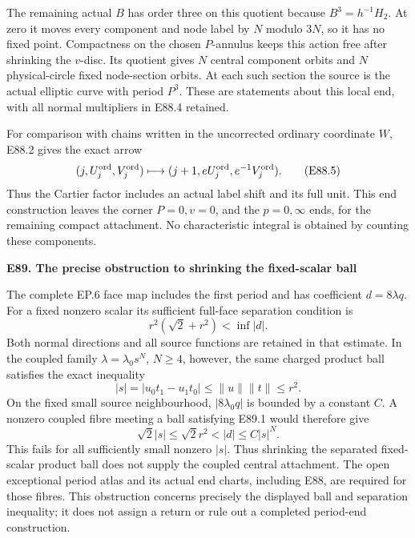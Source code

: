 The remaining actual \(B\) has order three on this
quotient because \(B^3=h^{-1}H_2\). At zero it moves
every component and node label by \(N\) modulo \(3N\),
so it has no fixed point. Compactness on the chosen
\(P\)-annulus keeps this action free after shrinking
the \(v\)-disc. Its quotient gives \(N\) central
component orbits and \(N\) physical-circle fixed
node-section orbits. At each such section the source
is the actual elliptic curve with period \(P^3\).
These are statements about this local end, with all
normal multipliers in E88.4 retained.

For comparison with chains written in the uncorrected
ordinary coordinate \(W\), E88.2 gives the exact arrow
\[
 (j,U_j^{\rm ord},V_j^{\rm ord})
 \longmapsto(j+1,eU_j^{\rm ord},e^{-1}V_j^{\rm ord}).
 \tag{E88.5}
\]
Thus the Cartier factor includes an actual label shift
and its full unit. This end construction leaves the
corner \(P=0,v=0\), and the \(p=0,\infty\) ends,
for the remaining compact attachment. No characteristic
integral is obtained by counting these components.

\par

\medskip\noindent\textbf{E89. The precise obstruction to shrinking the fixed-scalar ball}

\par\nobreak

The complete EP.6 face map includes the first period and
has coefficient \(d=8\lambda q\). For a fixed nonzero
scalar its sufficient full-face separation condition is
\[
 r^2(\sqrt2+r^2)<\inf|d|.
 \tag{E89.1}
\]
Both normal directions and all source functions are
retained in that estimate. In the coupled family
\(\lambda=\lambda_0s^N\), \(N\ge4\), however, the
same charged product ball satisfies the exact inequality
\[
 |s|=|u_0t_1-u_1t_0|\le\|u\|\|t\|\le r^2.
 \tag{E89.2}
\]
On the fixed small source neighbourhood, \(|8\lambda_0q|\)
is bounded by a constant \(C\). A nonzero coupled fibre
meeting a ball satisfying E89.1 would therefore give
\[
 \sqrt2|s|\le\sqrt2r^2<|d|\le C|s|^N.
 \tag{E89.3}
\]
This fails for all sufficiently small nonzero \(|s|\).
Thus shrinking the separated fixed-scalar product ball
does not supply the coupled central attachment. The
open exceptional period atlas and its actual end charts,
including E88, are required for those fibres. This
obstruction concerns precisely the displayed ball and
separation inequality; it does not assign a return or
rule out a completed period-end construction.

\par

